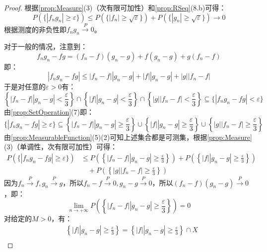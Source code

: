 \begin{proof}
	根据\cref{prop:Measure}(3)（次有限可加性）和\cref{prop:RSeq}(8.b)可得：
	\begin{equation*}
		P(\{|f_ng_n|\geqslant\varepsilon\})\leqslant P(\{|f_n|\geqslant\sqrt{\varepsilon}\})+P(\{|g_n|\geqslant\sqrt{\varepsilon}\})\to0
	\end{equation*}
	根据测度的非负性即$f_ng_n\overset{P}{\longrightarrow}0$。\par
	对于一般的情况，注意到：
	\begin{equation*}
		f_ng_n-fg=(f_n-f)(g_n-g)+f(g_n-g)+g(f_n-f)
	\end{equation*}
	即：
	\begin{equation*}
		|f_ng_n-fg|\leqslant|f_n-f||g_n-g|+|f||g_n-g|+|g||f_n-f|
	\end{equation*}
	于是对任意的$\varepsilon>0$有：
	\begin{equation*}
		\left\{|f_n-f||g_n-g|<\frac{\varepsilon}{3}\right\}\cap\left\{|f||g_n-g|<\frac{\varepsilon}{3}\right\}\cap\left\{|g||f_n-f|<\frac{\varepsilon}{3}\right\}\subseteq\{|f_ng_n-fg|<\varepsilon\}
	\end{equation*}
	由\cref{prop:SetOperation}(7)即：
	\begin{equation*}
		\{|f_ng_n-fg|\geqslant\varepsilon\}\subseteq\left\{|f_n-f||g_n-g|\geqslant\frac{\varepsilon}{3}\right\}\cup\left\{|f||g_n-g|\geqslant\frac{\varepsilon}{3}\right\}\cup\left\{|g||f_n-f|\geqslant\frac{\varepsilon}{3}\right\}
	\end{equation*}
	由\cref{prop:MeasurableFunction}(5)(2)可知上述集合都是可测集，根据\cref{prop:Measure}(3)（单调性，次有限可加性）可得：
	\begin{align*}
		P(\{|f_ng_n-fg|\geqslant\varepsilon\})&\leqslant P\left(\left\{|f_n-f||g_n-g|\geqslant\frac{\varepsilon}{3}\right\}\right)+P\left(\left\{|f||g_n-g|\geqslant\frac{\varepsilon}{3}\right\}\right) \\
		&\quad+P\left(\left\{|g||f_n-f|\geqslant\frac{\varepsilon}{3}\right\}
		\right)
	\end{align*}
	因为$f_n\overset{P}{\longrightarrow}f,g_n\overset{P}{\longrightarrow}g$，所以$f_n-f\overset{P}{\longrightarrow}0,g_n-g\overset{P}{\longrightarrow}0$，所以$(f_n-f)(g_n-g)\overset{P}{\longrightarrow}0$，即：
	\begin{equation*}
		\lim_{n\to+\infty}P\left(\left\{|f_n-f||g_n-g|\geqslant\frac{\varepsilon}{3}\right\}\right)=0
	\end{equation*}
	对给定的$M>0$，有：
	\begin{align*}
		&\left\{|f||g_n-g|\geqslant\frac{\varepsilon}{3}\right\}=\left\{|f||g_n-g|\geqslant\frac{\varepsilon}{3}\right\}\cap X \\

\end{align*}
\end{proof}
